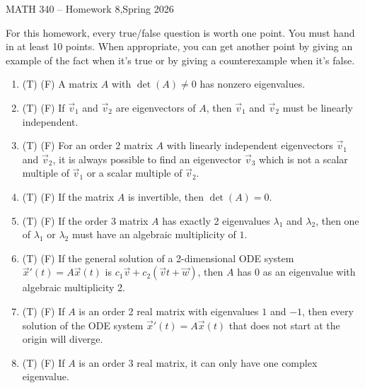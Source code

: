 \documentclass[12pt]{article}
\begin{document}
\begin{center}
   {\Large MATH 340 -- Homework 8,\quad Spring 2026}
\end{center}

For this homework, every true/false question is worth one point. You must hand in at least 10 points. When appropriate, you can get another point by giving an example of the fact when it's true or by giving a counterexample when it's false.

\begin{enumerate}

   \item (T) (F) A matrix \(A\) with \(\det(A)\neq 0\) has nonzero eigenvalues.
   \item (T) (F) If \(\vec{v}_1\) and \(\vec{v}_2\) are eigenvectors of \(A\), then \(\vec{v}_1\) and \(\vec{v}_2\) must be linearly independent.
   \item (T) (F) For an order 2 matrix \(A\) with linearly independent eigenvectors \(\vec{v}_1\) and \(\vec{v}_2\), it is always possible to find an eigenvector \(\vec{v}_3\) which is not a scalar multiple of \(\vec{v}_1\) or a scalar multiple of \(\vec{v}_2\).
   \item (T) (F) If the matrix \(A\) is invertible, then \(\det(A)=0\).
   \item (T) (F) If the order 3 matrix \(A\) has exactly 2 eigenvalues \(\lambda_1\) and \(\lambda_2\), then one of \(\lambda_1\) or \(\lambda_2\) must have an algebraic multiplicity of \(1\).
   \item (T) (F) If the general solution of a 2-dimensional ODE system \(\vec{x}'(t)=A\vec{x}(t)\) is \(c_1\vec{v}+c_2(\vec{v}t+\vec{w})\), then \(A\) has 0 as an eigenvalue with algebraic multiplicity 2.
   \item (T) (F) If \(A\) is an order 2 real matrix with eigenvalues \(1\) and \(-1\), then every solution of the ODE system \(\vec{x}'(t)=A\vec{x}(t)\) that does not start at the origin will diverge.
   \item (T) (F) If \(A\) is an order 3 real matrix, it can only have one complex eigenvalue.

\end{enumerate}
\end{document}
